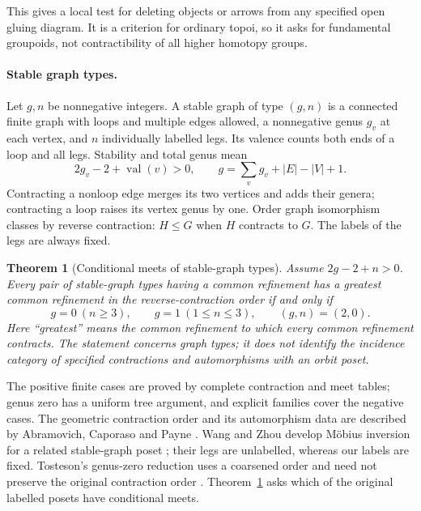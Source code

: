 \documentclass[11pt,a4paper]{article}
\newtheorem{theorem}{Theorem}[section]
\theoremstyle{definition}
\begin{document}
This gives a local test for deleting objects or arrows from any specified open gluing diagram. It is a criterion for ordinary topoi, so it asks for fundamental groupoids, not contractibility of all higher homotopy groups.

\paragraph{Stable graph types.}
Let $g,n$ be nonnegative integers. A stable graph of type $(g,n)$ is a connected finite graph with loops
and multiple edges allowed, a nonnegative genus $g_v$ at each vertex,
and $n$ individually labelled legs. Its valence counts both ends of
a loop and all legs. Stability and total genus mean
\[
 2g_v-2+\operatorname{val}(v)>0,
 \qquad g=\sum_v g_v+|E|-|V|+1.
\]
Contracting a nonloop edge merges its two vertices and adds their
genera; contracting a loop raises its vertex genus by one. Order graph
isomorphism classes by reverse contraction: $H\leq G$ when $H$
contracts to $G$. The labels of the legs are always fixed.

\begin{theorem}[Conditional meets of stable-graph types]\label{thm:graph-meets}
Assume $2g-2+n>0$. Every pair of stable-graph types having a common
refinement has a greatest common refinement in the reverse-contraction
order if and only if
\[
 g=0\ (n\geq3),\qquad
 g=1\ (1\leq n\leq3),\qquad (g,n)=(2,0).
\]
Here ``greatest'' means the common refinement to which every common
refinement contracts. The statement concerns graph types; it does
not identify the incidence category of specified contractions and
automorphisms with an orbit poset.
\end{theorem}

The positive finite cases are proved by complete contraction and meet tables; genus zero has a uniform tree argument, and explicit families cover the negative cases.
The geometric contraction order and its automorphism data are described
by Abramovich, Caporaso and Payne \cite[Sections~3.2--4.3,
pp.~775--780]{ACP}. Wang and Zhou develop M\"obius inversion for a
related stable-graph poset \cite[Section~3.2 and Appendix,
preprint pp.~8--12 and~20--23]{WangZhou}; their legs are unlabelled,
whereas our labels are fixed. Tosteson's genus-zero reduction uses a
coarsened order and need not preserve the original contraction order
\cite[Propositions~3.5 and~3.7, Warning~3.6,
preprint pp.~8--10]{Tosteson}. Theorem~\ref{thm:graph-meets}
asks which of the original labelled posets have conditional meets.
\end{document}
